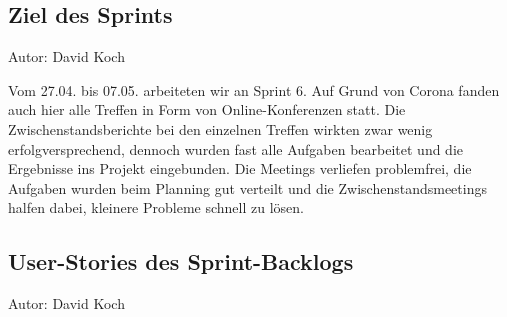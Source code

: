 \subsection{Ziel des Sprints}
{\small Autor: David Koch}

Vom 27.04. bis 07.05. arbeiteten wir an Sprint 6. Auf Grund von Corona fanden auch hier alle Treffen in Form von Online-Konferenzen statt. Die Zwischenstandsberichte bei den einzelnen Treffen wirkten zwar wenig erfolgversprechend, dennoch wurden fast alle Aufgaben bearbeitet und die Ergebnisse ins Projekt eingebunden.
Die Meetings verliefen problemfrei, die Aufgaben wurden beim Planning gut verteilt und die Zwischenstandsmeetings halfen dabei, kleinere Probleme schnell zu lösen.

\subsection{User-Stories des Sprint-Backlogs}
{\small Autor: David Koch}

